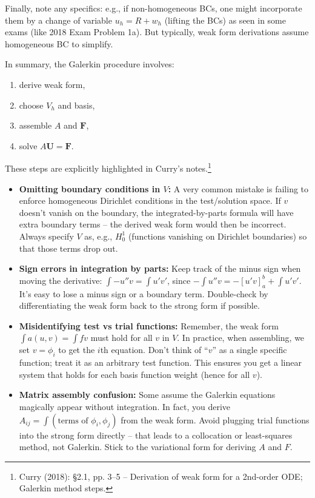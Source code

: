 \documentclass[a4paper,11pt]{report}
\begin{document}
Finally, note any specifics: e.g., if non-homogeneous BCs, one might incorporate them by a change of variable $u_h = R + w_h$ (lifting the BCs) as seen in some exams (like 2018 Exam Problem 1a). But typically, weak form derivations assume homogeneous BC to simplify.

In summary, the Galerkin procedure involves:
\begin{enumerate}[label=(\roman{*})]
    \item derive weak form,
    \item choose $V_h$ and basis,
    \item assemble $A$ and $\mathbf{F}$,
    \item solve $A\mathbf{U}=\mathbf{F}$.
\end{enumerate}
These steps are explicitly highlighted in Curry's notes.\footnote{Curry (2018): §2.1, pp. 3--5 -- Derivation of weak form for a 2nd-order ODE; Galerkin method steps.}
\begin{pitfalls}{}{}
    \begin{itemize}
        \item \textbf{Omitting boundary conditions in $V$:} A very common mistake is failing to enforce homogeneous Dirichlet conditions in the test/solution space. If $v$ doesn't vanish on the boundary, the integrated-by-parts formula will have extra boundary terms -- the derived weak form would then be incorrect. Always specify $V$ as, e.g., $H^1_0$ (functions vanishing on Dirichlet boundaries) so that those terms drop out.
        \item \textbf{Sign errors in integration by parts:} Keep track of the minus sign when moving the derivative: $\int -u''v = \int u'v'$, since $- \int u''v = -[u'v]_a^b + \int u'v'$. It's easy to lose a minus sign or a boundary term. Double-check by differentiating the weak form back to the strong form if possible.
        \item \textbf{Misidentifying test vs trial functions:} Remember, the weak form $\int a(u,v) = \int f v$ must hold for all $v$ in $V$. In practice, when assembling, we set $v=\phi_i$ to get the $i$th equation. Don't think of ``$v$'' as a single specific function; treat it as an arbitrary test function. This ensures you get a linear system that holds for each basis function weight (hence for all $v$).
        \item \textbf{Matrix assembly confusion:} Some assume the Galerkin equations magically appear without integration. In fact, you derive $A_{ij} = \int (\text{terms of }\phi_i,\phi_j)$ from the weak form. Avoid plugging trial functions into the strong form directly -- that leads to a collocation or least-squares method, not Galerkin. Stick to the variational form for deriving $A$ and $F$.
    \end{itemize}
\end{pitfalls}
\clearpage
\end{document}
